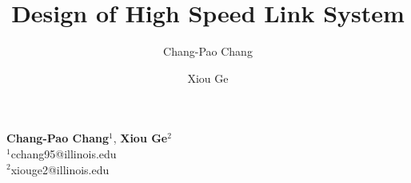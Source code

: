 \documentclass{book}  %
\begin{document}
\title{Design of High Speed Link System}
\maketitle

\author      {Chang-Pao Chang}
\address     {}%
\phone       {} %
\fax         {} %
\misc        { }  %
\nomakeauthor

\author      {Xiou Ge}
\address     {}%
\phone       {} %
\fax         {} %
\misc        { }  %
\nomakeauthor

\begin{authors}	
	{\bf Chang-Pao Chang}$^{1}$, {\bf Xiou Ge}$^{2}$\\
	\medskip
	$^{1}$cchang95@illinois.edu\\
	$^{2}$xiouge2@illinois.edu	
\end{authors}
\end{document}
